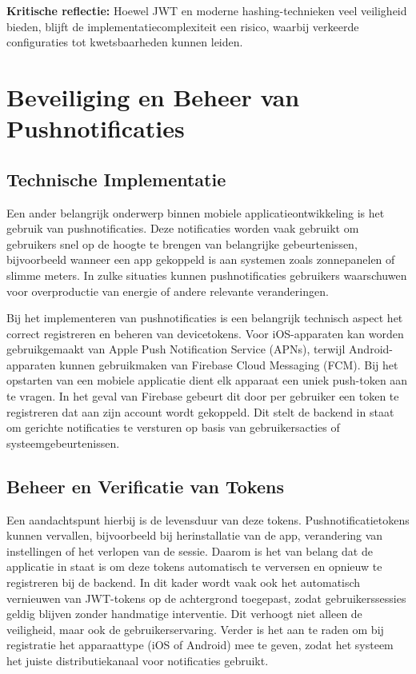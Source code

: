\textbf{Kritische reflectie:} Hoewel JWT en moderne hashing-technieken veel veiligheid bieden, blijft de implementatiecomplexiteit een risico, waarbij verkeerde configuraties tot kwetsbaarheden kunnen leiden.

\section{Beveiliging en Beheer van Pushnotificaties}

\subsection{Technische Implementatie}
Een ander belangrijk onderwerp binnen mobiele applicatieontwikkeling is het gebruik van pushnotificaties. Deze notificaties worden vaak gebruikt om gebruikers snel op de hoogte te brengen van belangrijke gebeurtenissen, bijvoorbeeld wanneer een app gekoppeld is aan systemen zoals zonnepanelen of slimme meters. In zulke situaties kunnen pushnotificaties gebruikers waarschuwen voor overproductie van energie of andere relevante veranderingen.

Bij het implementeren van pushnotificaties is een belangrijk technisch aspect het correct registreren en beheren van devicetokens. Voor iOS-apparaten kan worden gebruikgemaakt van Apple Push Notification Service (APNs), terwijl Android-apparaten kunnen gebruikmaken van Firebase Cloud Messaging (FCM). Bij het opstarten van een mobiele applicatie dient elk apparaat een uniek push-token aan te vragen. In het geval van Firebase gebeurt dit door per gebruiker een token te registreren dat aan zijn account wordt gekoppeld. Dit stelt de backend in staat om gerichte notificaties te versturen op basis van gebruikersacties of systeemgebeurtenissen.

\subsection{Beheer en Verificatie van Tokens}
Een aandachtspunt hierbij is de levensduur van deze tokens. Pushnotificatietokens kunnen vervallen, bijvoorbeeld bij herinstallatie van de app, verandering van instellingen of het verlopen van de sessie. Daarom is het van belang dat de applicatie in staat is om deze tokens automatisch te verversen en opnieuw te registreren bij de backend. In dit kader wordt vaak ook het automatisch vernieuwen van JWT-tokens op de achtergrond toegepast, zodat gebruikerssessies geldig blijven zonder handmatige interventie. Dit verhoogt niet alleen de veiligheid, maar ook de gebruikerservaring. Verder is het aan te raden om bij registratie het apparaattype (iOS of Android) mee te geven, zodat het systeem het juiste distributiekanaal voor notificaties gebruikt.

